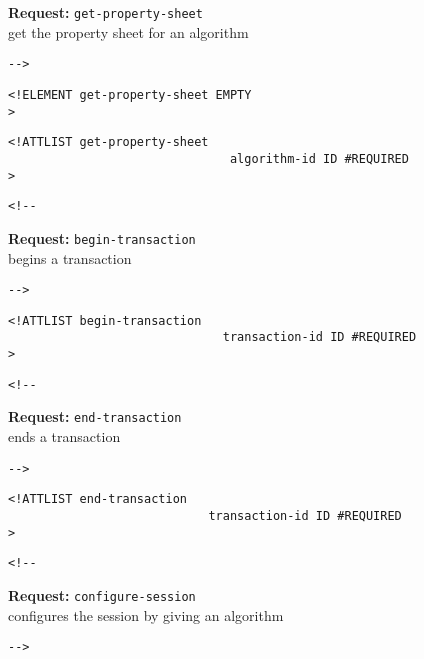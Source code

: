 \documentclass{article}
\newcommand{\requesttitle}[1]{\textbf{Request: }{\texttt{#1}}\\}
\begin{document}
     \requesttitle{get-property-sheet}
     get the property sheet for an algorithm

       
 \begin{verbatim}-->\end{verbatim}



\begin{verbatim}
<!ELEMENT get-property-sheet EMPTY 
>\end{verbatim}

\begin{verbatim}
<!ATTLIST get-property-sheet 
                               algorithm-id ID #REQUIRED
>\end{verbatim}

\begin{verbatim}<!--\end{verbatim}
   

     \requesttitle{begin-transaction}
     begins a transaction 

       
 \begin{verbatim}-->\end{verbatim}



\begin{verbatim}
<!ATTLIST begin-transaction 
                              transaction-id ID #REQUIRED
>\end{verbatim}

\begin{verbatim}<!--\end{verbatim}
   

     \requesttitle{end-transaction}
     ends a transaction 

       
 \begin{verbatim}-->\end{verbatim}



\begin{verbatim}
<!ATTLIST end-transaction 
                            transaction-id ID #REQUIRED
>\end{verbatim}

\begin{verbatim}<!--\end{verbatim}
  

     \requesttitle{configure-session}
     configures the session by giving an algorithm     

      
 \begin{verbatim}-->\end{verbatim}
\end{document}
